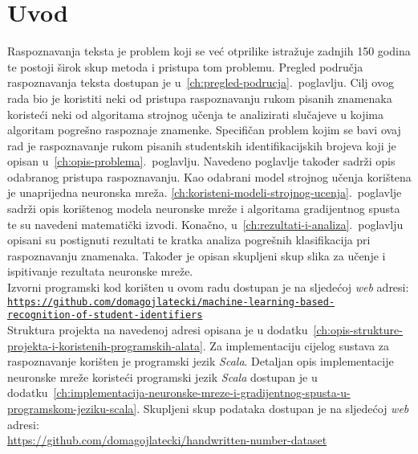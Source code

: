 \chapter{Uvod}
\label{ch:uvod}
Raspoznavanja teksta je problem koji se već otprilike istražuje zadnjih 150 godina te postoji širok skup metoda i
pristupa tom problemu. Pregled područja raspoznavanja teksta dostupan je u\ \ref{ch:pregled-podrucja}.\ poglavlju.
Cilj ovog rada bio je koristiti neki od pristupa raspoznavanju rukom pisanih znamenaka koristeći neki od algoritama
strojnog učenja te analizirati slučajeve u kojima algoritam pogrešno raspoznaje znamenke. Specifičan problem kojim se
bavi ovaj rad je raspoznavanje rukom pisanih studentskih identifikacijskih brojeva koji je opisan
u\ \ref{ch:opis-problema}.\ poglavlju. Navedeno poglavlje također sadrži opis odabranog pristupa raspoznavanju. Kao
odabrani model strojnog učenja korištena je unaprijedna neuronska mreža.
\ref{ch:koristeni-modeli-strojnog-ucenja}.\ poglavlje sadrži opis korištenog modela neuronske mreže i algoritama
gradijentnog spusta te su navedeni matematički izvodi. Konačno, u\ \ref{ch:rezultati-i-analiza}.\ poglavlju opisani su
postignuti rezultati te kratka analiza pogrešnih klasifikacija pri raspoznavanju znamenaka. Također je opisan skupljeni
skup slika za učenje i ispitivanje rezultata neuronske mreže.\\
Izvorni programski kod korišten u ovom radu dostupan je na sljedećoj \emph{web} adresi:\\
\small\href{https://github.com/domagojlatecki/machine-learning-based-recognition-of-student-identifiers}
{\texttt{https://github.com/domagojlatecki/machine-learning-based-\\recognition-of-student-identifiers}}\\
\normalsize
Struktura projekta na navedenoj adresi opisana je u
dodatku\ \ref{ch:opis-strukture-projekta-i-koristenih-programskih-alata}. Za implementaciju cijelog sustava za
raspoznavanje korišten je programski jezik \emph{Scala}. Detaljan opis implementacije neuronske mreže koristeći
programski jezik \emph{Scala} dostupan je u
dodatku\ \ref{ch:implementacija-neuronske-mreze-i-gradijentnog-spusta-u-programskom-jeziku-scala}. Skupljeni skup
podataka dostupan je na sljedećoj \emph{web} adresi:\\
\small
\url{https://github.com/domagojlatecki/handwritten-number-dataset}
\normalsize
